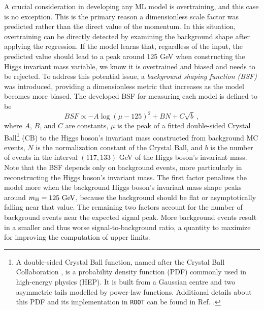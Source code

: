 A crucial consideration in developing any ML model is overtraining, and this case is no exception. This is the primary reason a dimensionless scale factor was predicted rather than the direct value of the momentum. In this situation, overtraining can be directly detected by examining the background shape after applying the regression. If the model learns that, regardless of the input, the predicted value should lead to a peak around 125 GeV when constructing the Higgs invariant mass variable, we know it is overtrained and biased and needs to be rejected. To address this potential issue, a \textit{background shaping function (BSF)} was introduced, providing a dimensionless metric that increases as the model becomes more biased. The developed BSF for measuring each model is defined to be
\begin{equation*}
    BSF \propto -A\log{(\mu-125)^2} + B N + C \sqrt{b}\ ,
\end{equation*}
where $A$, $B$, and $C$ are constants, $\mu$ is the peak of a fitted double-sided Crystal Ball\footnote{A double-sided Crystal Ball function, named after the Crystal Ball Collaboration \cite{A2:CB}, is a probability density function (PDF) commonly used in high-energy physics (HEP). It is built from a Gaussian centre and two asymmetric tails modelled by power-law functions. Additional details about this PDF and its implementation in \verb+ROOT+ can be found in Ref. \cite{CERN:root_CB}.} (CB) to the Higgs boson's invariant mass constructed from background MC events, $N$ is the normalization constant of the Crystal Ball, and $b$ is the number of events in the interval $(117, 133)$ GeV of the Higgs boson's invariant mass. Note that the BSF depends only on background events, more particularly in reconstructing the Higgs boson's invariant mass. The first factor penalizes the model more when the background Higgs boson's invariant mass shape peaks around $m_\text{H}=125\ \text{GeV}$, because the background should be flat or asymptotically falling near that value. The remaining two factors account for the number of background events near the expected signal peak. More background events result in a smaller and thus worse signal-to-background ratio, a quantity to maximize for improving the computation of upper limits.


